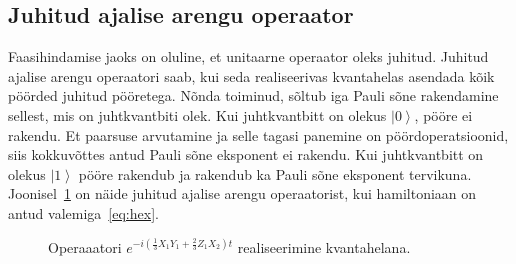 \documentclass[12pt]{report}
\def\paren#1{\left(#1\right)}
\def\ket#1{\left|#1\right>}
\begin{document}
\subsection{Juhitud ajalise arengu operaator}\label{sec:cu}

Faasihindamise jaoks on oluline, et unitaarne operaator oleks juhitud.
Juhitud ajalise arengu operaatori saab, kui seda realiseerivas kvantahelas asendada kõik pöörded juhitud pööretega.
Nõnda toiminud, sõltub iga Pauli sõne rakendamine sellest, mis on juhtkvantbiti olek.
Kui juhtkvantbitt on olekus \(\ket{0}\), pööre ei rakendu.
Et paarsuse arvutamine ja selle tagasi panemine on pöördoperatsioonid, siis kokkuvõttes antud Pauli sõne eksponent ei rakendu.
Kui juhtkvantbitt on olekus \(\ket{1}\) pööre rakendub ja rakendub ka Pauli sõne eksponent tervikuna.
Joonisel~\ref{fig:trotexctrl} on näide juhitud ajalise arengu operaatorist, kui hamiltoniaan on antud valemiga~\eqref{eq:hex}.

\begin{figure}
    \centering
    \ifdefined\yquanton
    \fi
    \caption{Operaaatori \(e^{-i\paren{\frac{1}{3}X_1Y_1+\frac{2}{3}Z_1X_2} t}\) realiseerimine kvantahelana.}
    \label{fig:trotexctrl}
\end{figure}
\end{document}

